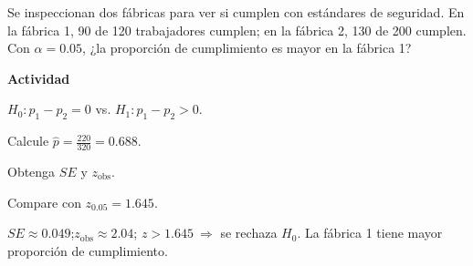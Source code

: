 \begin{ejercicio}
Se inspeccionan dos fábricas para ver si cumplen con estándares de seguridad.
En la fábrica 1, 90 de 120 trabajadores cumplen;
en la fábrica 2, 130 de 200 cumplen.
Con $\alpha=0.05$, ¿la proporción de cumplimiento es mayor en la fábrica 1?


\textbf{Actividad}
\begin{pasos}
  \item $H_0:p_1-p_2=0$ vs. $H_1:p_1-p_2>0$.
  \item Calcule $\hat{p}=\tfrac{220}{320}=0.688$.
  \item Obtenga $SE$ y $z_{\text{obs}}$.
  \item Compare con $z_{0.05}=1.645$.
\end{pasos}

\begin{clave}
$SE\approx 0.049$;\quad $z_{\text{obs}}\approx 2.04$;\quad
$z>1.645\ \Rightarrow$ se rechaza $H_0$.
La fábrica 1 tiene mayor proporción de cumplimiento.
\end{clave}
\end{ejercicio}

